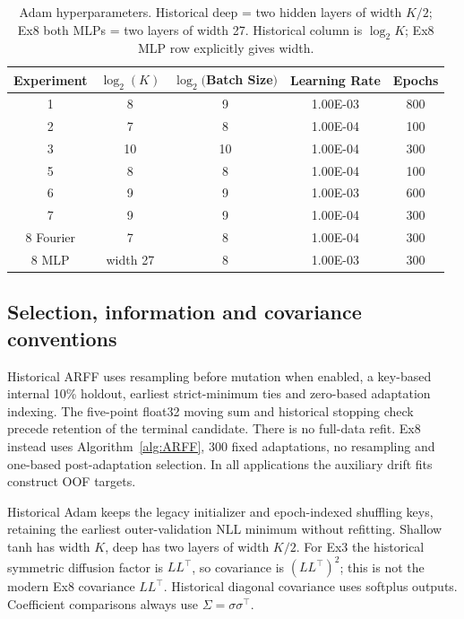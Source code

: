 \begin{table}[H]
\caption{Adam hyperparameters.
Historical deep = two hidden layers of width $K/2$; Ex8 both MLPs = two layers of width 27. Historical column is $\log_2 K$; Ex8 MLP row explicitly gives width.}
\label{tab:adam_hyperparams}
\centering
\begin{tabular}{ccccc}
\hline
Experiment & $\log_2(K)$ & $\log_2($Batch Size$)$ & Learning Rate & Epochs \\ \hline
1 & 8  & 9  & 1.00E-03 & 800 \\
2 & 7  & 8  & 1.00E-04 & 100 \\
3 & 10 & 10 & 1.00E-04 & 300 \\

5 & 8  & 8  & 1.00E-04 & 100 \\
6 & 9  & 9  & 1.00E-03 & 600 \\
7 & 9 & 9 & 1.00E-04 & 300 \\
8 Fourier & 7 & 8 & 1.00E-04 & 300 \\
8 MLP & \multicolumn{1}{c}{width 27} & 8 & 1.00E-03 & 300 \\ \hline
\end{tabular}
\end{table}



\subsection{Selection, information and covariance conventions}
Historical ARFF uses resampling before mutation when enabled, a key-based internal 10\% holdout, earliest strict-minimum ties and zero-based adaptation indexing. The five-point float32 moving sum and historical stopping check precede retention of the terminal candidate. There is no full-data refit. Ex8 instead uses Algorithm~\ref{alg:ARFF}, 300 fixed adaptations, no resampling and one-based post-adaptation selection. In all applications the auxiliary drift fits construct OOF targets.

Historical Adam keeps the legacy initializer and epoch-indexed shuffling keys, retaining the earliest outer-validation NLL minimum without refitting. Shallow tanh has width $K$, deep has two layers of width $K/2$. For Ex3 the historical symmetric diffusion factor is $LL^\top$, so covariance is $(LL^\top)^2$; this is not the modern Ex8 covariance $LL^\top$. Historical diagonal covariance uses softplus outputs. Coefficient comparisons always use $\Sigma=\sigma\sigma^\top$.

